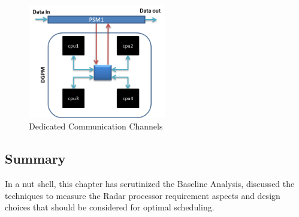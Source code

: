 \begin{figure}[h!]
	\centering
	\includegraphics[width=60mm]{figures/dedicated_channels}
	\caption{Dedicated Communication Channels}
	\label{fig:mm:dedicated_channels}
\end{figure}

\subsection{Summary}
In a nut shell, this chapter has scrutinized the Baseline Analysis, discussed the techniques to measure the Radar processor requirement aspects and design choices that should be considered for optimal scheduling.

